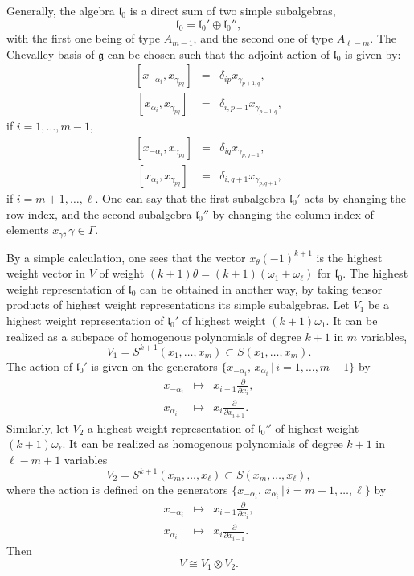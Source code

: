 \documentclass[a4paper, 10pt,oneside]{amsart}
\begin{document}
Generally, the algebra ${{\mathfrak l}}_0$ is a direct sum of two simple
subalgebras,
$${{\mathfrak l}}_0={{\mathfrak l}}_0'\oplus {{\mathfrak l}}_0'',$$
with the first one being of type $A_{m-1}$, and the second one of
type $A_{\ell-m}$. The Chevalley basis of ${{\mathfrak g}}$ can be chosen such
that the adjoint action of ${{\mathfrak l}}_0$ is given by:
\begin{eqnarray}
\label{erel2_jed} [x_{-\alpha_i},x_{\gamma_{pq}}] & = &
\delta_{ip}x_{\gamma_{p+1,q}},\\ \,[x_{\alpha_i},x_{\gamma_{pq}}] & =
& \delta_{i,p-1}x_{\gamma_{p-1,q}},\nonumber
\end{eqnarray}
if $i=1,\dots,m-1$,
\begin{eqnarray}
\label{erel3_jed} [x_{-\alpha_i},x_{\gamma_{pq}}] & = &
\delta_{iq}x_{\gamma_{p,q-1}},\\ \,[x_{\alpha_i},x_{\gamma_{pq}}] &
= & \delta_{i,q+1}x_{\gamma_{p,q+1}},\nonumber
\end{eqnarray}
if $i=m+1,\dots,\ell$. One can say that the first subalgebra
${{\mathfrak l}}_0'$ acts by changing the row-index, and the second subalgebra
${{\mathfrak l}}_0''$ by changing the column-index of elements
$x_\gamma,\gamma\in\Gamma.$ 

By a simple calculation, one sees that the vector $x_\theta(-1)^{k+1}$
is the highest weight vector in $V$ of weight
$(k+1)\theta=(k+1)(\omega_1+\omega_\ell)$ for ${{\mathfrak l}}_0$. The highest
weight representation of ${{\mathfrak l}}_0$ can be obtained in another way, by
taking tensor products of highest weight representations its simple
subalgebras. Let $V_1$ be a highest weight representation of
${{\mathfrak l}}_0'$ of highest weight $(k+1)\omega_1$. It can be realized as a
subspace of homogenous polynomials of degree $k+1$ in $m$ variables,
$$V_1=S^{k+1}(x_1,\dots,x_m)\subset S(x_1,\dots,x_m).$$
The action of ${{\mathfrak l}}_0'$ is given on the generators
$\{x_{-\alpha_i},\, x_{\alpha_i}\,|\, i=1,\dots,m-1\}$ by
\begin{eqnarray*}
x_{-\alpha_i} & \mapsto & x_{i+1}\frac{\partial}{\partial x_i},\\
x_{\alpha_i} & \mapsto & x_{i}\frac{\partial}{\partial x_{i+1}}.
\end{eqnarray*}
Similarly, let $V_2$ a highest weight representation of ${{\mathfrak l}}_0''$
of highest weight $(k+1)\omega_\ell$. It can be realized as
homogenous polynomials of degree $k+1$ in $\ell-m+1$ variables
$$V_2=S^{k+1}(x_m,\dots,x_\ell)\subset S(x_m,\dots,x_\ell),$$ where
the action is defined on the generators $\{x_{-\alpha_i},\,
x_{\alpha_i}\,|\, i=m+1,\dots,\ell\}$ by
\begin{eqnarray*}
x_{-\alpha_i} & \mapsto & x_{i-1}\frac{\partial}{\partial x_i},\\
x_{\alpha_i} & \mapsto & x_{i}\frac{\partial}{\partial x_{i-1}}.
\end{eqnarray*}
Then
$$V\cong V_1\otimes V_2.$$
\end{document}
